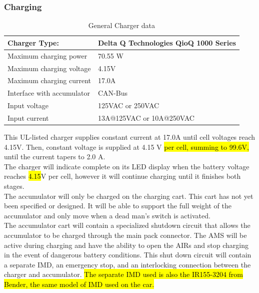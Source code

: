 \documentclass{article}
\DeclareRobustCommand{\hlr}[1]{{\sethlcolor{red}\hl{#1}}}
\begin{document}
        \subsubsection{Charging} \label{charging}


            \begin{table}[H]
            \centering
            \begin{tabular}{|l|l|}
            \hline
            Charger Type: & Delta Q Technologies QioQ 1000 Series \\ \hline
            Maximum charging power & 70.55 W \\ \hline
            Maximum charging voltage & 4.15V \\ \hline
            Maximum charging current & 17.0A \\ \hline
            Interface with accumulator & CAN-Bus \\ \hline
            Input voltage & 125VAC or 250VAC \\ \hline
            Input current & 13A@125VAC or 10A@250VAC \\ \hline
            \end{tabular}
            \caption{General Charger data}
            \label{charger}
            \end{table}

            This UL-listed charger supplies constant current at 17.0A until cell voltages reach 4.15V. Then, constant voltage is supplied at 4.15 V \hlr{per cell, summing to 99.6V,} until the current tapers to 2.0 A.\\

            The charger will indicate complete on its LED display when the battery voltage reaches \hlr{4.15}V per cell, however it will continue charging until it finishes both stages.\\

            The accumulator will only be charged on the charging cart. This cart has not yet been specified or designed. It will be able to support the full weight of the accumulator and only move when a dead man's switch is activated.\\

            The accumulator cart will contain a specialized shutdown circuit that allows the accumulator to be charged through the main pack connector. The AMS will be active during charging and have the ability to open the AIRs and stop charging in the event of dangerous battery conditions. This shut down circuit will contain a separate IMD, an emergency stop, and an interlocking connection between the charger and accumulator. \hlr{ The separate IMD used is also the IR155-3204 from Bender, the same model of IMD used on the car.}
\end{document}
